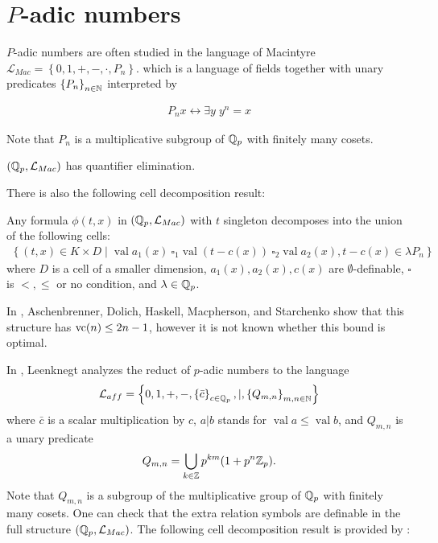 \documentclass{amsart}
\renewcommand{\LL}{\mathcal L}
\newcommand{\LLM}{\mathcal L_{Mac}}
\newcommand{\curly}[1]{\left\{#1\right\}}
\DeclareMathOperator{\vval}{val}
\begin{document}

\section{$P$-adic numbers}


$P$-adic numbers are often studied in the language of Macintyre $\LLM = \curly{0, 1, +, -, \cdot, P_n}$.
which is a language of fields together with unary predicates $\curly{P_n}_{n \in \N} $ interpreted by

\begin{align*}
  P_n x \leftrightarrow \exists y \; y^n = x
\end{align*}  

Note that $P_n$ is a multiplicative subgroup of $\mathbb{Q}_p$ with finitely many cosets.

\begin{Theorem} [???]
  $(\Q_p, \LLM)$ has quantifier elimination.
\end{Theorem}

There is also the following cell decomposition result:

\begin{Theorem} [???]
  Any formula $\phi(t, x)$ in $(\Q_p, \LLM)$ with $t$ singleton decomposes into the union of the following cells:
  \begin{align*}
    \curly{(t, x) \in K \times D \mid \vval a_1(x) \ \square_1 \vval (t - c(x)) \ \square_2 \vval a_2(x), t - c(x) \in \lambda P_n}
  \end{align*}
  where $D$ is a cell of a smaller dimension,
  $a_1(x), a_2(x), c(x)$ are $\emptyset$-definable,
  $\square$ is $<, \leq$ or no condition, and
  $\lambda  \in\mathbb{Q}_p$.    
\end{Theorem}  

In \cite{density}, Aschenbrenner, Dolich, Haskell, Macpherson, and Starchenko show that this structure has $\operatorname{vc}(n) \leq 2n - 1$,
however it is not known whether this bound is optimal.

In \cite{reduct}, Leenknegt analyzes the reduct of $p$-adic numbers to the language
\begin{align*}
  \LL_{aff}  = \curly{0, 1, +, -, \curly{\bar c}_{c \in \Q_p}, |, \curly{Q_{m,n}}_{m,n\in \N}}
\end{align*}
where $\bar c$ is a scalar multiplication by $c$,
$a | b$ stands for $\vval a \leq \vval b$,
and $Q_{m,n}$ is a unary predicate
\begin{align*}
  Q_{m,n} = \bigcup_{k \in \mathbb{Z}} p^{km} (1 + p^n\mathbb{Z}_p).
\end{align*}
Note that $Q_{m,n}$ is a subgroup of the multiplicative group of $\mathbb{Q}_p$ with finitely many cosets.
One can check that the extra relation symbols are definable in the full structure $(\Q_p, \LLM)$.
The following cell decomposition result is provided by \cite{reduct}:
\end{document}
